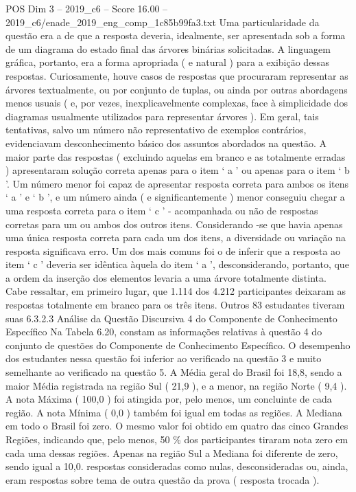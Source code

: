 \begin{textsample}{POS Dim 3 – 2019\_c6 – Score 16.00 – 2019\_c6/enade\_2019\_eng\_comp\_1c85b99fa3.txt}
Uma particularidade da questão era a de que a resposta deveria, idealmente, ser apresentada sob a forma de um diagrama do estado final das árvores binárias solicitadas.
A linguagem gráfica, portanto, era a forma apropriada ( e natural ) para a exibição dessas respostas.
Curiosamente, houve casos de respostas que procuraram representar as árvores textualmente, ou por conjunto de tuplas, ou ainda por outras abordagens menos usuais ( e, por vezes, inexplicavelmente complexas, face à simplicidade dos diagramas usualmente utilizados para representar árvores ).
Em geral, tais tentativas, salvo um número não representativo de exemplos contrários, evidenciavam desconhecimento básico dos assuntos abordados na questão.
A maior parte das respostas ( excluindo aquelas em branco e as totalmente erradas ) apresentaram solução correta apenas para o item ‘ a ’ ou apenas para o item ‘ b ’.
Um número menor foi capaz de apresentar resposta correta para ambos os itens ‘ a ’ e ‘ b ’, e um número ainda ( e significantemente ) menor conseguiu chegar a uma resposta correta para o item ‘ c ’ - acompanhada ou não de respostas corretas para um ou ambos dos outros itens.
Considerando -se que havia apenas uma única resposta correta para cada um dos itens, a diversidade ou variação na resposta significava erro.
Um dos mais comuns foi o de inferir que a resposta ao item ‘ c ’ deveria ser idêntica àquela do item ‘ a ’, desconsiderando, portanto, que a ordem da inserção dos elementos levaria a uma árvore totalmente distinta.
Cabe ressaltar, em primeiro lugar, que 1.114 dos 4.212 participantes deixaram as respostas totalmente em branco para os três itens.
Outros 83 estudantes tiveram suas 6.3.2.3 Análise da Questão Discursiva 4 do Componente de Conhecimento Específico Na Tabela 6.20, constam as informações relativas à questão 4 do conjunto de questões do Componente de Conhecimento Específico.
O desempenho dos estudantes nessa questão foi inferior ao verificado na questão 3 e muito semelhante ao verificado na questão 5.
A Média geral do Brasil foi 18,8, sendo a maior Média registrada na região Sul ( 21,9 ), e a menor, na região Norte ( 9,4 ).
A nota Máxima ( 100,0 ) foi atingida por, pelo menos, um concluinte de cada região.
A nota Mínima ( 0,0 ) também foi igual em todas as regiões.
A Mediana em todo o Brasil foi zero.
O mesmo valor foi obtido em quatro das cinco Grandes Regiões, indicando que, pelo menos, 50 \% dos participantes tiraram nota zero em cada uma dessas regiões.
Apenas na região Sul a Mediana foi diferente de zero, sendo igual a 10,0. respostas consideradas como nulas, desconsideradas ou, ainda, eram respostas sobre tema de outra questão da prova ( resposta trocada ).

\end{textsample}
